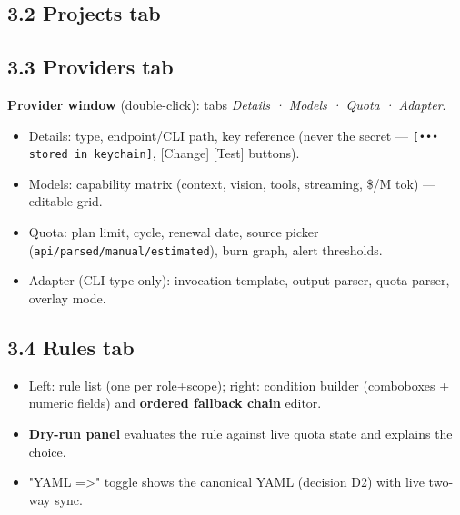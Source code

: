 \documentclass[10pt,a4paper]{article}
\begin{document}
\subsection{3.2 Projects tab}
\begin{center}

\end{center}

\subsection{3.3 Providers tab}
\begin{center}

\end{center}

\textbf{Provider window} (double-click): tabs \emph{Details · Models · Quota · Adapter}.

\begin{itemize}
  \item Details: type, endpoint/CLI path, key reference (never the secret — \texttt{[••• stored in keychain]},
[Change] [Test] buttons).

  \item Models: capability matrix (context, vision, tools, streaming, \$/M tok) — editable grid.
  \item Quota: plan limit, cycle, renewal date, source picker (\texttt{api/parsed/manual/estimated}),
burn graph, alert thresholds.

  \item Adapter (CLI type only): invocation template, output parser, quota parser, overlay mode.
\end{itemize}
\subsection{3.4 Rules tab}
\begin{center}

\end{center}

\begin{itemize}
  \item Left: rule list (one per role+scope); right: condition builder (comboboxes + numeric
fields) and \textbf{ordered fallback chain} editor.

  \item \textbf{Dry-run panel} evaluates the rule against live quota state and explains the choice.
  \item "YAML =>" toggle shows the canonical YAML (decision D2) with live two-way sync.
\end{itemize}
\end{document}
